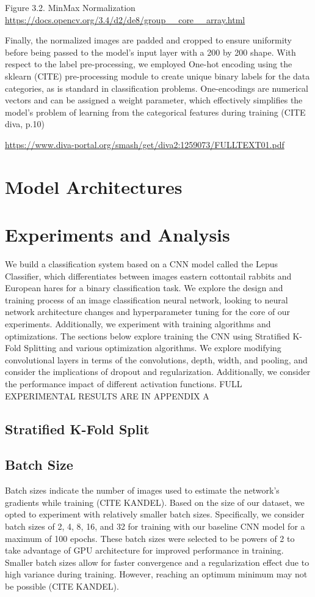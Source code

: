 \documentclass{article}
\begin{document}
Figure 3.2. MinMax Normalization 
\url{https://docs.opencv.org/3.4/d2/de8/group__core__array.html}

Finally, the normalized images are padded and cropped to ensure uniformity before being passed to the model's input layer with a 200 by 200 shape. With respect to the label pre-processing, we employed One-hot encoding using the sklearn (CITE) pre-processing module to create unique binary labels for the data categories, as is standard in classification problems. One-encodings are numerical vectors and can be assigned a weight parameter, which effectively simplifies the model's problem of learning from the categorical features during training (CITE diva, p.10) 

\url{https://www.diva-portal.org/smash/get/diva2:1259073/FULLTEXT01.pdf}


\section{Model Architectures}


\section{Experiments and Analysis}
We build a classification system based on a CNN model called the Lepus Classifier, which differentiates between images eastern cottontail rabbits and European hares for a binary classification task. We explore the design and training process of an image classification neural network, looking to neural network architecture changes and hyperparameter tuning for the core of our experiments. Additionally, we experiment with training algorithms and optimizations. The sections below explore training the CNN using Stratified K-Fold Splitting and various optimization algorithms. We explore modifying convolutional layers in terms of the convolutions, depth, width, and pooling, and consider the implications of dropout and regularization. Additionally, we consider the performance impact of different activation functions.  FULL EXPERIMENTAL RESULTS ARE IN APPENDIX A

\subsection{Stratified K-Fold Split}
\subsection{Batch Size}
Batch sizes indicate the number of images used to estimate the network’s gradients while training (CITE KANDEL). Based on the size of our dataset, we opted to experiment with relatively smaller batch sizes. Specifically, we consider batch sizes of 2, 4, 8, 16, and 32 for training with our baseline CNN model for a maximum of 100 epochs. These batch sizes were selected to be powers of 2 to take advantage of GPU architecture for improved performance in training. Smaller batch sizes allow for faster convergence and a regularization effect due to high variance during training. However, reaching an optimum minimum may not be possible (CITE KANDEL). 
\end{document}

